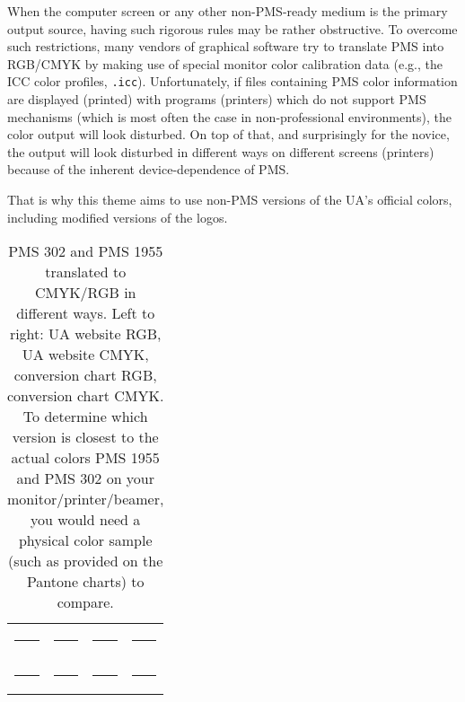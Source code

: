 When the computer screen or any other non-PMS-ready medium is the primary output source, having such rigorous rules may be rather obstructive. To overcome such restrictions, many vendors of graphical software try to translate PMS into RGB/CMYK by making use of special monitor color calibration data (e.g., the ICC color profiles, \lstinline!.icc!). Unfortunately, if files containing PMS color information are displayed (printed) with programs (printers) which do not support PMS mechanisms (which is most often the case in non-professional environments), the color output will look disturbed. On top of that, and surprisingly for the novice, the output will look disturbed in different ways on different screens (printers) because of the inherent device-dependence of PMS.

That is why this theme aims to use non-PMS versions of the UA's official colors, including modified versions of the logos.

\begin{table}
\centering
\newlength{\boxsize}
\setlength{\boxsize}{2cm}

\begin{tabular}{cccc}
\definecolor{uablue11}{RGB}{  0, 61,100}
\colorbox{uablue11}{\rule{0mm}{\boxsize}\rule{\boxsize}{0mm}}
&
\definecolor{uablue12}{cmyk}{1,0.3,0,0.62}
\colorbox{uablue12}{\rule{0mm}{\boxsize}\rule{\boxsize}{0mm}}
&
\definecolor{uablue13}{RGB}{0,96,128}
\colorbox{uablue13}{\rule{0mm}{\boxsize}\rule{\boxsize}{0mm}}
&
\definecolor{uablue14}{cmyk}{1,0.25,0,0.5}
\colorbox{uablue14}{\rule{0mm}{\boxsize}\rule{\boxsize}{0mm}}\\[2mm]
\definecolor{uared11}{RGB}{126,  0, 47}
\colorbox{uared11}{\rule{0mm}{\boxsize}\rule{\boxsize}{0mm}}
&
\definecolor{uared11}{cmyk}{0,1,0.54,0.46}
\colorbox{uared11}{\rule{0mm}{\boxsize}\rule{\boxsize}{0mm}}
&
\definecolor{uared11}{RGB}{161,0,64}
\colorbox{uared11}{\rule{0mm}{\boxsize}\rule{\boxsize}{0mm}}
&
\definecolor{uared11}{cmyk}{0,1,0.6,0.37}
\colorbox{uared11}{\rule{0mm}{\boxsize}\rule{\boxsize}{0mm}}
\end{tabular}

\caption{PMS 302 and PMS 1955 translated to CMYK/RGB in different ways. Left to right: UA website \cite{KAN::} RGB, UA website \cite{KAN::} CMYK, conversion chart \cite{::TDC} RGB, conversion chart \cite{::TDC} CMYK. To determine which version is closest to the actual colors PMS 1955 and PMS 302 on your monitor/printer/beamer, you would need a physical color sample (such as provided on the Pantone\textsuperscript{\textregistered} charts) to compare.}
\label{table:reds-blues}
\end{table}

